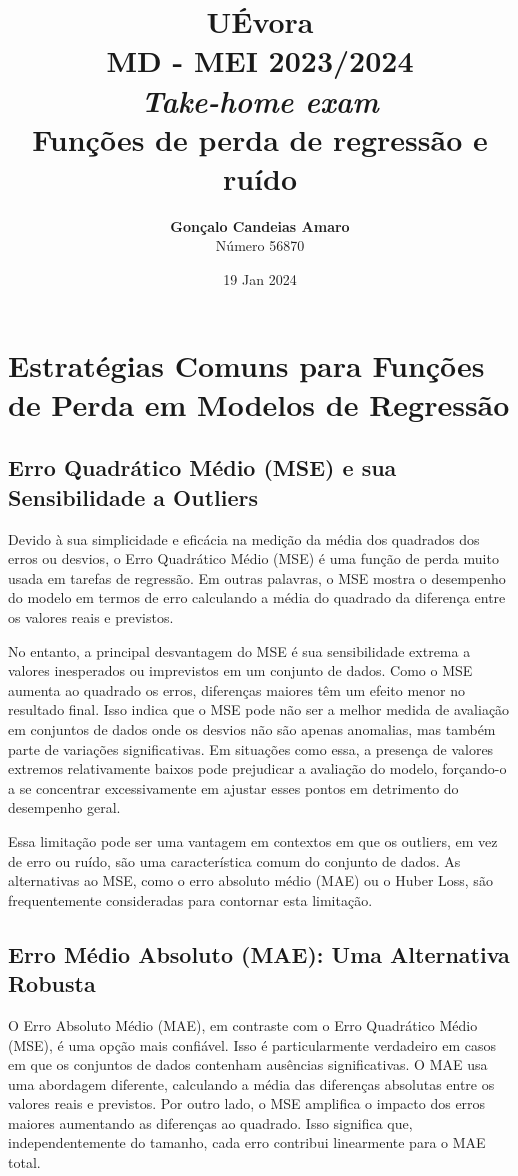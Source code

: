 \documentclass{article}
\title{UÉvora\\MD - MEI 2023/2024\\\textit{Take-home exam}\\\textbf{Funções de perda de regressão e ruído}}
\author{\textbf{Gonçalo Candeias Amaro}\\Número 56870}
\date{19 Jan 2024}
\begin{document}
\maketitle

\section{Estratégias Comuns para Funções de Perda em Modelos de Regressão}

\subsection{Erro Quadrático Médio (MSE) e sua Sensibilidade a Outliers}

Devido à sua simplicidade e eficácia na medição da média dos quadrados dos erros ou desvios, o Erro Quadrático Médio (MSE) é uma função de perda muito usada em tarefas de regressão. Em outras palavras, o MSE mostra o desempenho do modelo em termos de erro calculando a média do quadrado da diferença entre os valores reais e previstos.

No entanto, a principal desvantagem do MSE é sua sensibilidade extrema a valores inesperados ou imprevistos em um conjunto de dados. Como o MSE aumenta ao quadrado os erros, diferenças maiores têm um efeito menor no resultado final. Isso indica que o MSE pode não ser a melhor medida de avaliação em conjuntos de dados onde os desvios não são apenas anomalias, mas também parte de variações significativas. Em situações como essa, a presença de valores extremos relativamente baixos pode prejudicar a avaliação do modelo, forçando-o a se concentrar excessivamente em ajustar esses pontos em detrimento do desempenho geral.

Essa limitação pode ser uma vantagem em contextos em que os outliers, em vez de erro ou ruído, são uma característica comum do conjunto de dados. As alternativas ao MSE, como o erro absoluto médio (MAE) ou o Huber Loss, são frequentemente consideradas para contornar esta limitação.

\subsection{Erro Médio Absoluto (MAE): Uma Alternativa Robusta}

O Erro Absoluto Médio (MAE), em contraste com o Erro Quadrático Médio (MSE), é uma opção mais confiável. Isso é particularmente verdadeiro em casos em que os conjuntos de dados contenham ausências significativas. O MAE usa uma abordagem diferente, calculando a média das diferenças absolutas entre os valores reais e previstos. Por outro lado, o MSE amplifica o impacto dos erros maiores aumentando as diferenças ao quadrado. Isso significa que, independentemente do tamanho, cada erro contribui linearmente para o MAE total.
\end{document}
